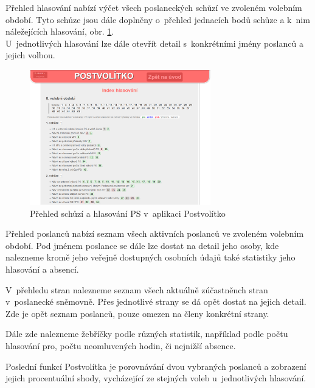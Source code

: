 \par Přehled hlasování nabízí výčet všech poslaneckých schůzí ve zvoleném volebním období. Tyto schůze jsou dále doplněny o~přehled jednacích bodů schůze a k~nim náležejících hlasování, obr. \ref{fig:postvolitko-hlasovani}. \\
U~jednotlivých hlasování lze dále otevřít detail s~konkrétními jmény poslanců a jejich volbou.

\begin{figure}
    \centering
    \includegraphics[width=0.7\textwidth]{obrazky-figures/postvolitko-hlasovani.png}
    \caption{Přehled schůzí a hlasování PS v~aplikaci Postvolítko}
    \label{fig:postvolitko-hlasovani}
\end{figure}

\par Přehled poslanců nabízí seznam všech aktivních poslanců ve zvoleném volebním období. Pod jménem poslance se dále lze dostat na detail jeho osoby, kde nalezneme kromě jeho veřejně dostupných osobních údajů také statistiky jeho hlasování a absencí.


\par V~přehledu stran nalezneme seznam všech aktuálně zúčastněnch stran v~poslanecké sněmovně. Přes jednotlivé strany se dá opět dostat na jejich detail. Zde je opět seznam poslanců, pouze omezen na členy konkrétní strany.

\par Dále zde nalezneme žebříčky podle různých statistik, například podle počtu hlasování pro, počtu neomluvených hodin, či nejnižší absence. 
\par Poslední funkcí Postvolítka je porovnávání dvou vybraných poslanců a zobrazení jejich procentuální shody, vycházející ze stejných voleb u~jednotlivých hlasování.


